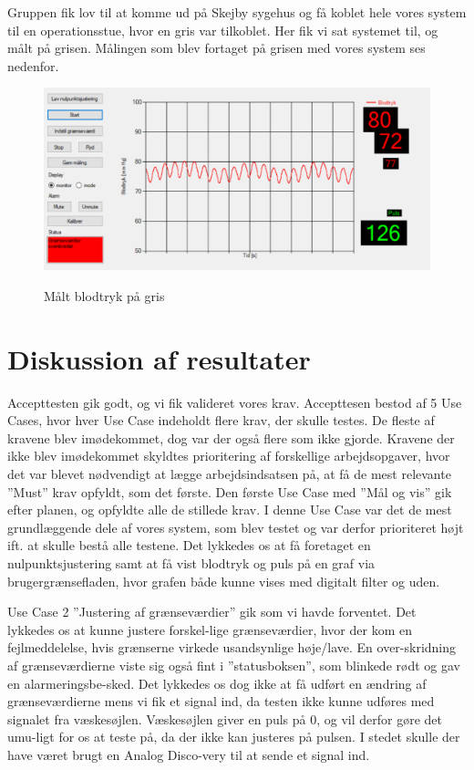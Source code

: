 Gruppen fik lov til at komme ud på Skejby sygehus og få koblet hele vores system til en operationsstue, hvor en gris var tilkoblet. Her fik vi sat systemet til, og målt på grisen. Målingen som blev fortaget på grisen med vores system ses nedenfor.

\vspace{0.5 cm}
\begin{figure}[h!]
	\centering
	\includegraphics[width=0.7\linewidth]{Resultater/Resultater/gris}
	\label{fig:gris}
	\caption{Målt blodtryk på gris}
\end{figure}

\section{Diskussion af resultater}

Accepttesten gik godt, og vi fik valideret vores krav. Accepttesen bestod af 5 Use Cases, hvor hver Use Case indeholdt flere krav, der skulle testes. De fleste af kravene blev imødekommet, dog var der også flere som ikke gjorde. Kravene der ikke blev imødekommet skyldtes prioritering af forskellige arbejdsopgaver, hvor det var blevet nødvendigt at lægge arbejdsindsatsen på, at få de mest relevante ”Must” krav opfyldt, som det første.
Den første Use Case med ”Mål og vis” gik efter planen, og opfyldte alle de stillede krav. I denne Use Case var det de mest grundlæggende dele af vores system, som blev testet og var derfor prioriteret højt ift. at skulle bestå alle testene. Det lykkedes os at få foretaget en nulpunktsjustering samt at få vist blodtryk og puls på en graf via brugergrænsefladen, hvor grafen både kunne vises med digitalt filter og uden. 

Use Case 2 ”Justering af grænseværdier” gik som vi havde forventet. Det lykkedes os at kunne justere forskel-lige grænseværdier, hvor der kom en fejlmeddelelse, hvis grænserne virkede usandsynlige høje/lave.  En over-skridning af grænseværdierne viste sig også fint i ”statusboksen”, som blinkede rødt og gav en alarmeringsbe-sked. Det lykkedes os dog ikke at få udført en ændring af grænseværdierne mens vi fik et signal ind, da testen ikke kunne udføres med signalet fra væskesøjlen. Væskesøjlen giver en puls på 0, og vil derfor gøre det umu-ligt for os at teste på, da der ikke kan justeres på pulsen. I stedet skulle der have været brugt en Analog Disco-very til at sende et signal ind.

